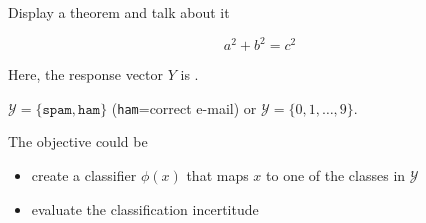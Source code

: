 \begin{frame}{Display a theorem and talk about it}

\vspace{0.4cm}

{
\begin{equation*}
a^2 + b^2 = c^2
\end{equation*}
}

\vspace{0.25cm}

Here, the response vector $Y$ is .

\vspace{0.25cm}

\exple
$\mathcal{Y} = \{\texttt{spam},  \texttt{ham}\}$ (\texttt{ham}=correct e-mail) or $\mathcal{Y}= \{0, 1, \dots,9\}$.

The objective could be
\begin{itemize}
	\item create a classifier $\phi(x)$ that maps $x$ to one of the classes in $\mathcal{Y}$
	\item evaluate the classification incertitude 
\end{itemize}


\end{frame}



